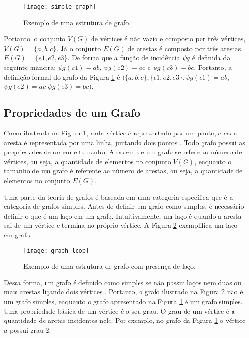 \begin{figure}[H]
	\centering
    \texttt{[image: simple\_graph]}
    \caption{Exemplo de uma estrutura de grafo.}
    \label{graph_definition}
\end{figure}

	Portanto, o conjunto \(V(G)\) de vértices é não vazio e composto por três vértices, \(V(G)=\{a,b,c\}\). Já o conjunto \(E(G)\) de arestas é composto por três arestas, \(E(G)=\{e1,e2,e3\}\). De forma que a função de incidência \(\psi g\) é definida da seguinte maneira: \(\psi g(e1)= ab\), \(\psi g(e2)= ac\) e \(\psi g(e3)= bc\). Portanto, a definição formal do grafo da Figura \ref{graph_definition} é \((\{a,b,c\}, \{e1,e2,e3\}, \psi g(e1)= ab\), \(\psi g(e2)= ac\) \(\psi g(e3)= bc)\).
	
\subsection{Propriedades de um Grafo}
	Como ilustrado na Figura \ref{graph_definition}, cada vértice é representado por um ponto, e cada aresta é representada por uma linha, juntando dois pontos \cite{bondy1976graph}. Todo grafo possui as propriedades de ordem e tamanho. A ordem de um grafo se refere ao número de vértices, ou seja, a quantidade de elementos no conjunto \(V(G)\), enquanto o tamanho de um grafo é referente ao número de arestas, ou seja, a quantidade de elementos no conjunto \(E(G)\).
	
	Uma parte da teoria de grafos é baseada em uma categoria específica que é a categoria de grafos simples. Antes de definir um grafo como simples, é necessário definir o que é um laço em um grafo. Intuitivamente, um laço é quando a aresta sai de um vértice e termina no próprio vértice. A Figura \ref{graph_loop} exemplifica um laço em grafo.

\begin{figure}[H]
	\centering
    \texttt{[image: graph\_loop]}
    \caption{Exemplo de uma estrutura de grafo com presença de laço.}
    \label{graph_loop}
\end{figure}

	Dessa forma, um grafo é definido como simples se não possui laços nem duas ou mais arestas ligando dois vértices \cite{bondy1976graph}. Portanto, o grafo ilustrado na Figura \ref{graph_loop} não é um grafo simples, enquanto o grafo apresentado na Figura \ref{graph_definition} é um grafo simples. Uma propriedade básica de um vértice é o seu grau. O grau de um vértice é a quantidade de aretas incidentes nele. Por exemplo, no grafo da Figura \ref{graph_definition} o vértice \(a\) possui grau 2.
	
